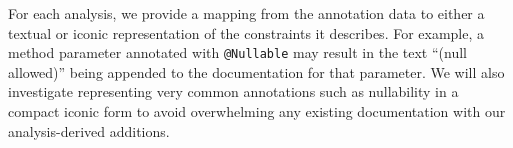 For each analysis, we provide a mapping from the annotation data to either a
textual or iconic representation of the constraints it describes. For example,
a method parameter annotated with \texttt{@Nullable} may result in the text
``(null allowed)'' being appended to the documentation for that parameter. We
will also investigate representing very common annotations such as nullability
in a compact iconic form to avoid overwhelming any existing documentation with
our analysis-derived additions.
